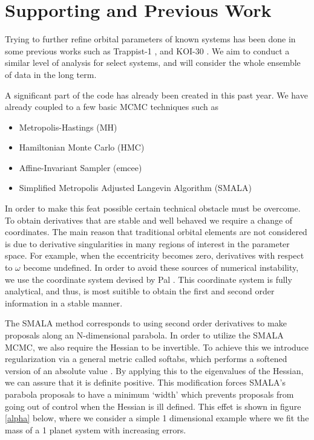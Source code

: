 \section{Supporting and Previous Work}
Trying to further refine orbital parameters of known systems has been done in some previous works such as Trappist-1 \cite{1704.04290}, and KOI-30 \cite{1707.04962} .
We aim to conduct a similar level of analysis for select systems, and will consider the whole ensemble of data in the long term.


A significant part of the code has already been created in this past year.
We have already coupled \reb to a few basic MCMC techniques such as 
\begin{itemize}
	\item Metropolis-Hastings (MH)
	\item Hamiltonian Monte Carlo (HMC)
	\item Affine-Invariant Sampler (emcee)
	\item Simplified Metropolis Adjusted Langevin Algorithm (SMALA)
\end{itemize}
In order to make this feat possible certain technical obstacle must be overcome.
To obtain derivatives that are stable and well behaved we require a change of coordinates.
The main reason that traditional orbital elements are not considered is due to derivative singularities in many regions of interest in the parameter space.
For example, when the eccentricity becomes zero, derivatives with respect to $\omega$ become undefined.
In order to avoid these sources of numerical instability, we use the coordinate system devised by Pal \cite{pal2009analytical}.
This coordinate system is fully analytical, and thus, is most suitible to obtain the first and second order information in a stable manner.


The SMALA method corresponds to using second order derivatives to make proposals along an N-dimensional parabola.
In order to utilize the SMALA MCMC, we also require the Hessian to be invertible.
To achieve this we introduce regularization via a general metric called softabs, which performs a softened version of an absolute value \cite{softabs}.
By applying this to the eigenvalues of the Hessian, we can assure that it is definite positive.
This modification forces SMALA's parabola proposals to have a minimum `width' which prevents proposals from going out of control when the Hessian is ill defined.
This effet is shown in figure \ref{alpha} below, where we consider a simple 1 dimensional example where we fit the mass of a 1 planet system with increasing errors.

